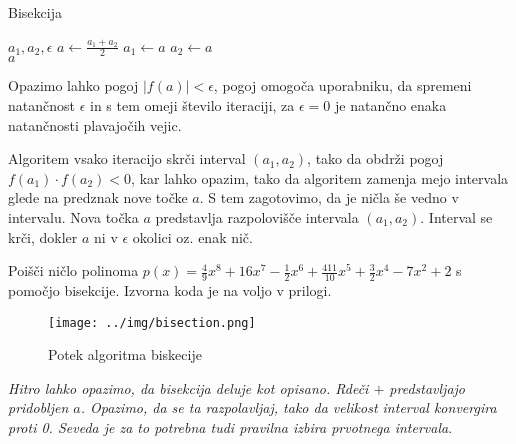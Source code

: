 \begin{algorithm}[H]
\caption{Bisekcija}
\begin{algorithmic}
\Require $a_1, a_2, \epsilon$
 
\State $a \gets \frac{a_1 + a_2}{2}$ 
 
    \State $ a_1 \gets a$
\Else{}
    \State $a_2 \gets a$
\EndIf
\EndWhile \\
\Return $a$
\end{algorithmic}
\end{algorithm}

Opazimo lahko pogoj $|f(a)| < \epsilon$, pogoj omogoča uporabniku, da spremeni natančnost $\epsilon$ in s tem omeji število iteraciji, za $\epsilon = 0$ je natančno enaka natančnosti plavajočih vejic.

Algoritem vsako iteracijo skrči interval $(a_1, a_2)$, tako da obdrži pogoj $f(a_1) \cdot f(a_2) < 0$, kar lahko opazim, tako da algoritem zamenja mejo intervala glede na predznak nove točke $a$. S tem zagotovimo, da je ničla še vedno v intervalu. Nova točka $a$ predstavlja razpolovišče intervala $(a_1, a_2)$. Interval se krči, dokler $a$ ni v $\epsilon$ okolici oz. enak nič.

\begin{primer}
    Poišči ničlo polinoma $p(x) = \frac{4}{9}x^8 + 16x^7 - \frac{1}{2}x^6 + \frac{411}{10}x^5 + \frac{3}{2}x^4 - 7x^2 + 2$ s pomočjo bisekcije. Izvorna koda je na voljo v prilogi.

\begin{figure}[H]
    \centering
    \texttt{[image: ../img/bisection.png]}
    \caption{Potek algoritma biskecije}
    \label{fig:bisection}
\end{figure}
\noindent
\textit{Hitro lahko opazimo, da bisekcija deluje kot opisano. Rdeči $+$ predstavljajo pridobljen $a$. Opazimo, da se ta razpolavljaj, tako da velikost interval konvergira proti 0. Seveda je za to potrebna tudi pravilna izbira prvotnega intervala}.
    
\end{primer}






